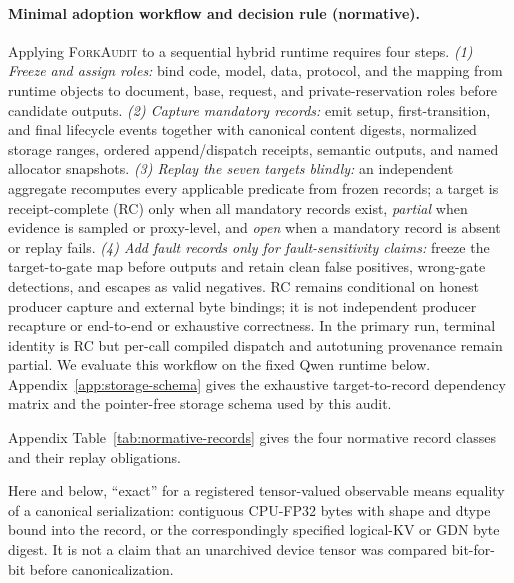 \documentclass{article}
\newcommand{\method}{\textsc{ForkAudit}}
\begin{document}
\paragraph{Minimal adoption workflow and decision rule (normative).}
Applying \method{} to a sequential hybrid runtime requires four steps.
\emph{(1) Freeze and assign roles:} bind code, model, data, protocol, and the
mapping from runtime objects to document, base, request, and private-reservation
roles before candidate outputs.  \emph{(2) Capture mandatory records:} emit
setup, first-transition, and final lifecycle events together with canonical
content digests, normalized storage ranges, ordered append/dispatch receipts,
semantic outputs, and named allocator snapshots.  \emph{(3) Replay the seven
targets blindly:} an independent aggregate recomputes every applicable
predicate from frozen records; a target is receipt-complete (RC) only when all
mandatory records exist, \emph{partial} when evidence is sampled or proxy-level,
and \emph{open} when a mandatory record is absent or replay fails.
\emph{(4) Add fault records only for fault-sensitivity claims:} freeze the
target-to-gate map before outputs and retain clean false positives, wrong-gate
detections, and escapes as valid negatives.  RC remains conditional on honest
producer capture and external byte bindings; it is not independent producer
recapture or end-to-end or exhaustive correctness.  In the primary run,
terminal identity is RC but per-call compiled dispatch and autotuning provenance
remain partial.  We evaluate this workflow on the fixed Qwen runtime below.
Appendix~\ref{app:storage-schema}
gives the exhaustive target-to-record dependency matrix and the pointer-free
storage schema used by this audit.

Appendix Table~\ref{tab:normative-records} gives the four normative record
classes and their replay obligations.

Here and below, ``exact'' for a registered tensor-valued observable means
equality of a canonical serialization: contiguous CPU-FP32 bytes with shape
and dtype bound into the record, or the correspondingly specified logical-KV
or GDN byte digest.  It is not a claim that an unarchived device tensor was
compared bit-for-bit before canonicalization.
\end{document}
